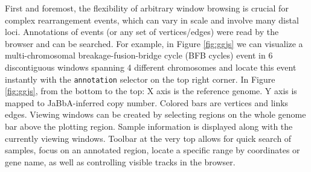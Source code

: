 \documentclass[phd,tocprelim]{cornell}
\renewcommand{\caption}[1]{\singlespacing\hangcaption{#1}\normalspacing}
\begin{document}
\begin{figure}[ht]
\end{figure}

\clearpage
% 
First and foremost, the flexibility of arbitrary window browsing is crucial for complex rearrangement events, which can vary in scale and involve many distal loci. Annotations of events (or any set of vertices/edges) were read by the browser and can be searched. For example, in Figure \ref{fig:ggjs} we can visualize a multi-chromosomal breakage-fusion-bridge cycle (BFB cycles) event in 6 discontiguous windows spanning 4 different chromosomes and locate this event instantly with the \texttt{annotation} selector on the top right corner. In Figure \ref{fig:ggjs}, from the bottom to the top: X axis is the reference genome. Y axis is mapped to JaBbA-inferred copy number. Colored bars are vertices and links edges. Viewing windows can be created by selecting regions on the whole genome bar above the plotting region. Sample information is displayed along with the currently viewing windows. Toolbar at the very top allows for quick search of samples, focus on an annotated region, locate a specific range by coordinates or gene name, as well as controlling visible tracks in the browser.
\end{document}
